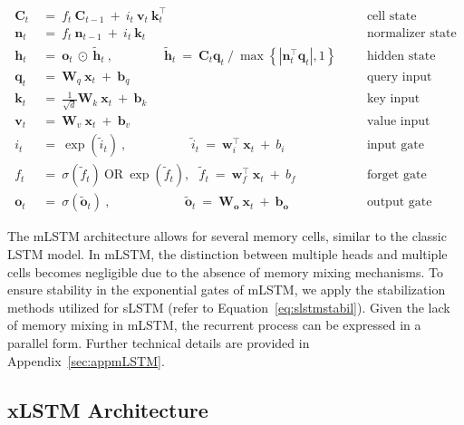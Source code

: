 \begin{align}
\label{eq:mlstm_recurrent_begin}
\mathbf{C}_t \ &= \  f_t \ \mathbf{C}_{t-1} \ + \ 
  i_t \ \mathbf{v}_t \ \mathbf{k}_t^\top & &  &\text{cell state} \\
\mathbf{n}_t \ &= \  f_t \ \mathbf{n}_{t-1} \ + \ 
  i_t \ \mathbf{k}_t & &  &\text{normalizer state} \\
\mathbf{h}_t  \ &= \ \mathbf{o}_t \ \odot \ \tilde{\mathbf{h}}_t
\ , \qquad \qquad 
\tilde{\mathbf{h}}_t \ = \   \mathbf{C}_t \mathbf{q}_t \ / \ 
  \max \left\{ |\mathbf{n}_t^\top \mathbf{q}_t|, 1 \right\} 
   &&&\text{hidden state} \\
\mathbf{q}_t \ &= \ \mathbf{W}_q \ \mathbf{x}_t \ + \ \mathbf{b}_q  & &  &\text{query input} \\
\mathbf{k}_t \ &= \ \frac{1}{\sqrt{d}} \mathbf{W}_k \ \mathbf{x}_t \ + \ \mathbf{b}_k  & &  &\text{key input} \\
\mathbf{v}_t \ &= \ \mathbf{W}_v \ \mathbf{x}_t \ + \ \mathbf{b}_v  & &  &\text{value input} \\
i_t \ &= \ \!\exp \!  \! \left( \tilde{i}_t  \right) \ , 
 \qquad \qquad \ \ \ \ \,
  \tilde{i}_t \ = \ \mathbf{w}^\top_{i} \ \mathbf{x}_t \ + \  b_{i} \ \ \ 
  &&&\text{input gate} \\
f_t \ &= \ \sigma \!  \left(  \tilde{f}_t \right) \ \text{OR} \ \!\exp \!  \! \left(  \tilde{f}_t \right) , \ \ \: \!
\tilde{f}_t \ = \ \mathbf{w}^\top_{f} \ \mathbf{x}_t  \ + \
  b_{f}
  &&& \text{forget gate} \\
\label{eq:mlstm_recurrent_end}
\mathbf{o}_t \ &= \ \sigma \left( \tilde{\mathbf{o}}_t \right) \ , \qquad \qquad \quad \ \ \ \,
  \tilde{\mathbf{o}}_t  \ = \ \mathbf{W}_{\mathbf{o}} \ \mathbf{x}_t \ + \
  \mathbf{b}_{\mathbf{o}}
  &&&\text{output gate} 
\end{align}

The mLSTM architecture allows for several memory cells, similar to the classic LSTM model. In mLSTM, the distinction between multiple heads and multiple cells becomes negligible due to the absence of memory mixing mechanisms. To ensure stability in the exponential gates of mLSTM, we apply the stabilization methods utilized for sLSTM (refer to Equation~\ref{eq:slstmstabil}). Given the lack of memory mixing in mLSTM, the recurrent process can be expressed in a parallel form. Further technical details are provided in Appendix~\ref{sec:appmLSTM}.

\subsection{xLSTM Architecture}
\label{sec:xLSTMarch}

